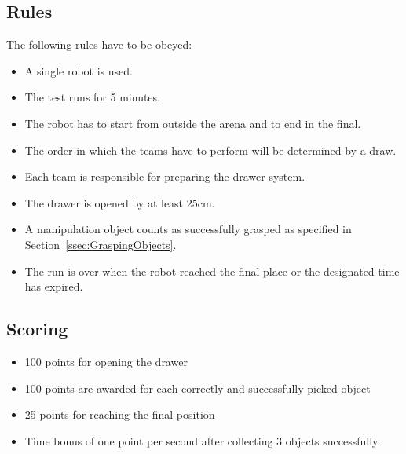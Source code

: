 \subsection{Rules}
The following rules have to be obeyed:

\begin{itemize}
\item A single robot is used.
\item The test runs for 5 minutes.
\item The robot has to start from outside the arena and to end in the final.
\item The order in which the teams have to perform will be determined by a draw.
\item Each team is responsible for preparing the drawer system.
\item The drawer is opened by at least 25cm.
\item A manipulation object counts as successfully grasped as specified in Section~\ref{ssec:GraspingObjects}.
\item The run is over when the robot reached the final place or the designated time has expired.
\end{itemize}

\subsection{Scoring}
\begin{itemize}
\item 100 points for opening the drawer
\item 100 points are awarded for each correctly and successfully picked object
\item 25 points for reaching the final position
\item Time bonus of one point per second after collecting 3 objects successfully.
\end{itemize}
